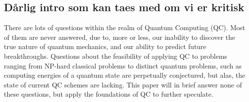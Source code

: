 \subsection{Dårlig intro som kan taes med om vi er kritisk}
There are lots of questions within the realm of Quantum Computing (QC). Most of them are never answered, due to, more or less, our inability to discover the true nature of quantum mechanics, and our ability to predict future breakthroughs. Questions about the feasibility of applying QC to problems ranging from NP-hard classical problems to distinct quantum problems, such as computing energies of a quantum state are perpetually conjectured, but alas, the state of current QC schemes are lacking. This paper will in brief answer none of these questions, but apply the foundations of QC to further speculate.
